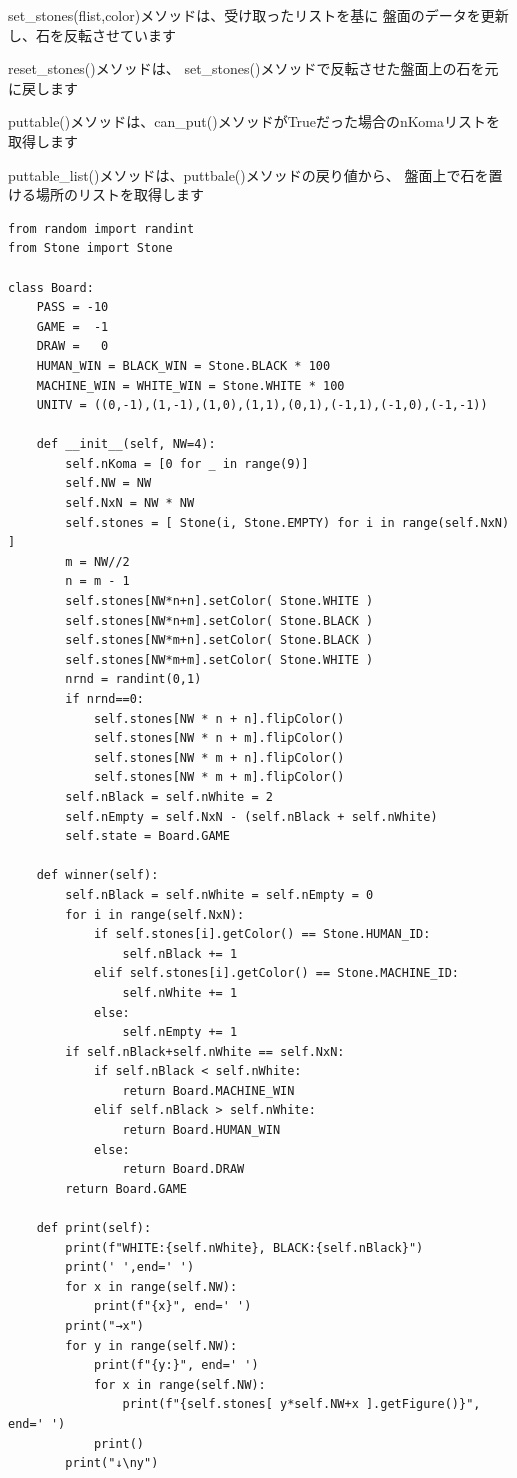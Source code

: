 \documentclass[uplatex,a4paper,11pt,oneside,openany]{jsbook}
\begin{document}
set\_stones(flist,color)メソッドは、受け取ったリストを基に
盤面のデータを更新し、石を反転させています

reset\_stones()メソッドは、
set\_stones()メソッドで反転させた盤面上の石を元に戻します

puttable()メソッドは、can\_put()メソッドがTrueだった場合のnKomaリストを取得します

puttable\_list()メソッドは、puttbale()メソッドの戻り値から、
盤面上で石を置ける場所のリストを取得します

\begin{lstlisting}[caption=Board class,label=othello05]
from random import randint
from Stone import Stone

class Board:
    PASS = -10
    GAME =  -1
    DRAW =   0
    HUMAN_WIN = BLACK_WIN = Stone.BLACK * 100
    MACHINE_WIN = WHITE_WIN = Stone.WHITE * 100
    UNITV = ((0,-1),(1,-1),(1,0),(1,1),(0,1),(-1,1),(-1,0),(-1,-1))

    def __init__(self, NW=4):
        self.nKoma = [0 for _ in range(9)]
        self.NW = NW
        self.NxN = NW * NW
        self.stones = [ Stone(i, Stone.EMPTY) for i in range(self.NxN) ]
        m = NW//2
        n = m - 1
        self.stones[NW*n+n].setColor( Stone.WHITE )
        self.stones[NW*n+m].setColor( Stone.BLACK )
        self.stones[NW*m+n].setColor( Stone.BLACK )
        self.stones[NW*m+m].setColor( Stone.WHITE )
        nrnd = randint(0,1)
        if nrnd==0:
            self.stones[NW * n + n].flipColor()
            self.stones[NW * n + m].flipColor()
            self.stones[NW * m + n].flipColor()
            self.stones[NW * m + m].flipColor()
        self.nBlack = self.nWhite = 2
        self.nEmpty = self.NxN - (self.nBlack + self.nWhite)
        self.state = Board.GAME

    def winner(self):
        self.nBlack = self.nWhite = self.nEmpty = 0
        for i in range(self.NxN):
            if self.stones[i].getColor() == Stone.HUMAN_ID:
                self.nBlack += 1
            elif self.stones[i].getColor() == Stone.MACHINE_ID:
                self.nWhite += 1
            else:
                self.nEmpty += 1
        if self.nBlack+self.nWhite == self.NxN:
            if self.nBlack < self.nWhite:
                return Board.MACHINE_WIN
            elif self.nBlack > self.nWhite:
                return Board.HUMAN_WIN
            else:
                return Board.DRAW
        return Board.GAME

    def print(self):
        print(f"WHITE:{self.nWhite}, BLACK:{self.nBlack}")
        print(' ',end=' ')
        for x in range(self.NW):
            print(f"{x}", end=' ')
        print("→x")
        for y in range(self.NW):
            print(f"{y:}", end=' ')
            for x in range(self.NW):
                print(f"{self.stones[ y*self.NW+x ].getFigure()}", end=' ')
            print()
        print("↓\ny")


\end{lstlisting}
\end{document}
